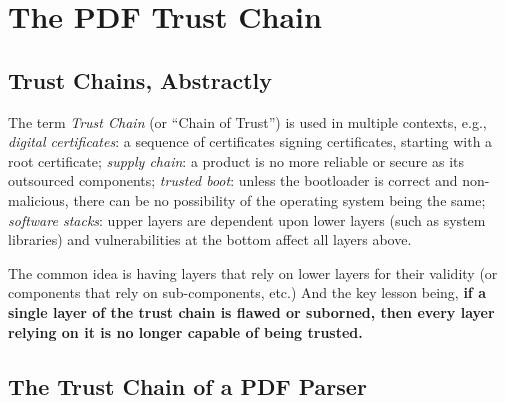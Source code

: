 \section{The PDF Trust Chain }
\label{sec:trust-chain}

\subsection{Trust Chains, Abstractly}

The term \emph{Trust Chain} (or ``Chain of Trust'') is used in multiple contexts, e.g.,
\emph{digital certificates}: a sequence of certificates signing certificates,
starting with a root certificate;
\emph{supply chain}: a product is no more reliable or secure as its
outsourced components;
\emph{trusted boot}: unless the bootloader is correct and non-malicious,
there can be no possibility of the operating system being the same;
\emph{software stacks}: upper layers are dependent upon lower layers (such as
system libraries) and vulnerabilities at the bottom affect all layers above.

The common idea is having layers
that rely on lower layers for their validity
(or components that rely on sub-components, etc.)
And the key lesson being,
{\bf{if a single layer of the trust chain 
  is flawed or suborned, then every layer relying on it
  is no longer capable of being trusted.}}

\subsection{The Trust Chain of a PDF Parser}



